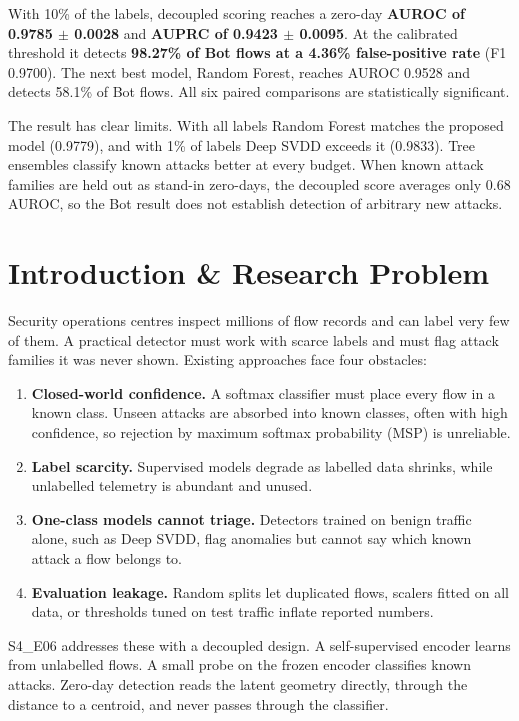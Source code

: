 \documentclass[10pt,a4paper]{article}
\begin{document}
With 10\% of the labels, decoupled scoring reaches a zero-day \textbf{AUROC of 0.9785 $\pm$ 0.0028} and \textbf{AUPRC of 0.9423 $\pm$ 0.0095}. At the calibrated threshold it detects \textbf{98.27\% of Bot flows at a 4.36\% false-positive rate} (F1 0.9700). The next best model, Random Forest, reaches AUROC 0.9528 and detects 58.1\% of Bot flows. All six paired comparisons are statistically significant.

The result has clear limits. With all labels Random Forest matches the proposed model (0.9779), and with 1\% of labels Deep SVDD exceeds it (0.9833). Tree ensembles classify known attacks better at every budget. When known attack families are held out as stand-in zero-days, the decoupled score averages only 0.68 AUROC, so the Bot result does not establish detection of arbitrary new attacks.

\section{Introduction \& Research Problem}
Security operations centres inspect millions of flow records and can label very few of them. A practical detector must work with scarce labels and must flag attack families it was never shown. Existing approaches face four obstacles:

\begin{enumerate}
\item \textbf{Closed-world confidence.} A softmax classifier must place every flow in a known class. Unseen attacks are absorbed into known classes, often with high confidence, so rejection by maximum softmax probability (MSP) is unreliable.
\item \textbf{Label scarcity.} Supervised models degrade as labelled data shrinks, while unlabelled telemetry is abundant and unused.
\item \textbf{One-class models cannot triage.} Detectors trained on benign traffic alone, such as Deep SVDD, flag anomalies but cannot say which known attack a flow belongs to.
\item \textbf{Evaluation leakage.} Random splits let duplicated flows, scalers fitted on all data, or thresholds tuned on test traffic inflate reported numbers.
\end{enumerate}
S4\_E06 addresses these with a decoupled design. A self-supervised encoder learns from unlabelled flows. A small probe on the frozen encoder classifies known attacks. Zero-day detection reads the latent geometry directly, through the distance to a centroid, and never passes through the classifier.
\end{document}

